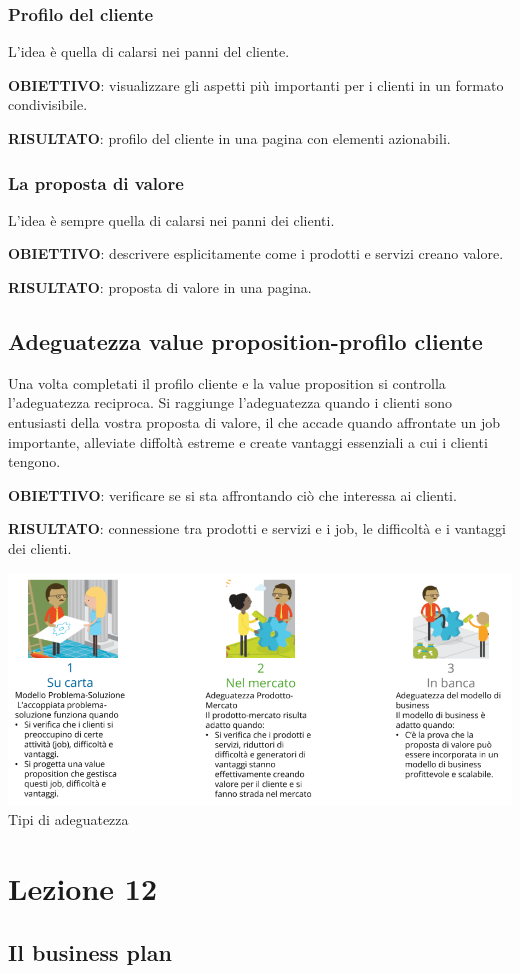 \documentclass[14pt]{extarticle}
\begin{document}
\newpage
\subsubsection{Profilo del cliente}

L'idea è quella di calarsi nei panni del cliente.

\textbf{OBIETTIVO}: visualizzare gli aspetti più importanti per i clienti in un
formato condivisibile.

\textbf{RISULTATO}: profilo del cliente in una pagina con elementi azionabili.

\subsubsection{La proposta di valore}

L'idea è sempre quella di calarsi nei panni dei clienti.

\textbf{OBIETTIVO}: descrivere esplicitamente come i prodotti e servizi creano
valore.

\textbf{RISULTATO}: proposta di valore in una pagina.

\newpage
\subsection{Adeguatezza value proposition-profilo cliente}

Una volta completati il profilo cliente e la value proposition si controlla
l'adeguatezza reciproca. Si raggiunge l'adeguatezza quando i clienti sono
entusiasti della vostra proposta di valore, il che accade quando affrontate un
job importante, alleviate diffoltà estreme e create vantaggi essenziali a cui i
clienti tengono.

\textbf{OBIETTIVO}: verificare se si sta affrontando ciò che interessa ai
clienti.

\textbf{RISULTATO}: connessione tra prodotti e servizi e i job, le difficoltà e
i vantaggi dei clienti.

\begin{center}
    \includegraphics[scale=0.60]{images/adeguatezza.png}
    Tipi di adeguatezza
\end{center}

\section{Lezione 12}

\subsection{Il business plan}
\end{document}
